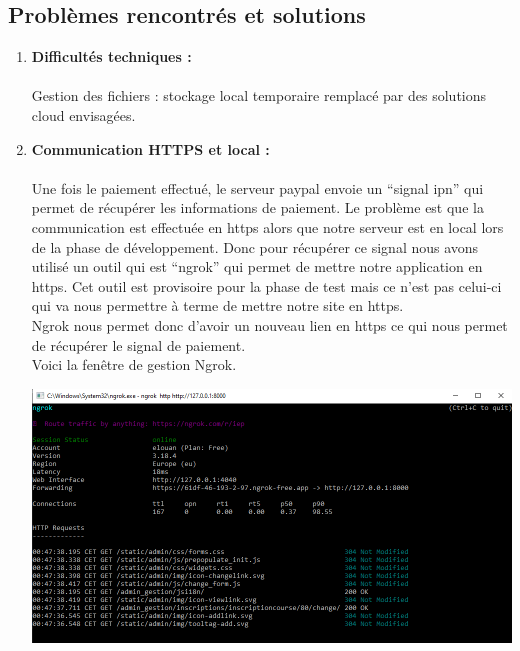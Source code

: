 \documentclass[12pt]{article} %
\begin{document}
	\subsection{Problèmes rencontrés et solutions}
        \begin{enumerate}
            \item \textbf{Difficultés techniques :}\\\\
                Gestion des fichiers : stockage local temporaire remplacé par des solutions cloud envisagées.
           		

            \item \textbf{Communication HTTPS et local :}\\\\
                Une fois le paiement effectué, le serveur paypal envoie un “signal ipn” qui permet de récupérer les informations de paiement. Le problème est que la communication est effectuée en https alors que notre serveur est en local lors de la phase de développement. Donc pour récupérer ce signal nous avons utilisé un outil qui est “ngrok” qui permet de mettre notre application en https. Cet outil est provisoire pour la phase de test mais ce n’est pas celui-ci qui va nous permettre à terme de mettre notre site en https.\\
                Ngrok nous permet donc d’avoir un nouveau lien en https ce qui nous permet de récupérer le signal de paiement.\\ Voici la fenêtre de gestion Ngrok.


                \includegraphics[scale=0.6]{images/Capture_M1Ngrok.PNG}

        \end{enumerate}
    
\end{document}
